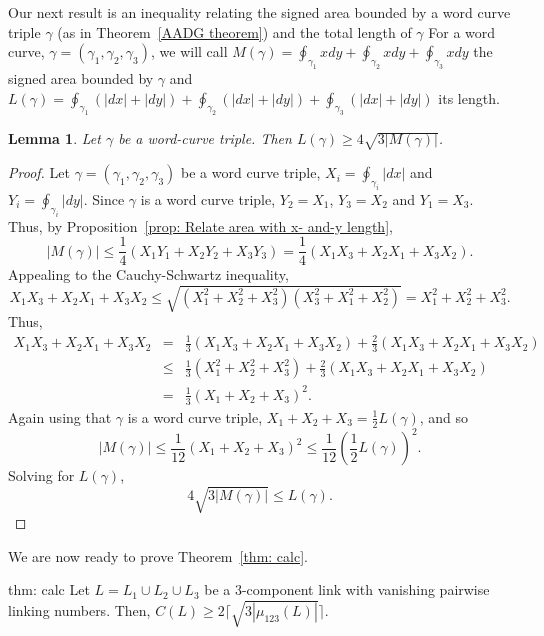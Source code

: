 \documentclass[11pt]{amsart}
\newtheorem{lemma}[theorem]{Lemma}
\theoremstyle{remark}
\newcommand{\Oint}{\displaystyle\oint}
\begin{document}
Our next result is an inequality relating the signed area bounded by a word curve triple $\gamma$ (as in Theorem~\ref{AADG theorem}) and the total length of $\gamma$ For a word curve, $\gamma = (\gamma_1, \gamma_2, \gamma_3)$, we will call $M(\gamma) = \Oint_{\gamma_1}xdy+\Oint_{\gamma_2}xdy+\Oint_{\gamma_3}xdy$ the signed area bounded by $\gamma$ and $L(\gamma) = \Oint_{\gamma_1}(|dx|+|dy|)+\Oint_{\gamma_2}(|dx|+|dy|)+\Oint_{\gamma_3}(|dx|+|dy|)$ its length.   

\begin{lemma}\label{lemma: do it for rectangles}
Let $\gamma$ be a  word-curve triple.  Then $L(\gamma)\ge 4\sqrt{3|M(\gamma)|}$.
\end{lemma}

\begin{proof}
Let $\gamma=(\gamma_1, \gamma_2, \gamma_3)$ be a word curve triple, $X_i=\Oint_{\gamma_i} |dx|$ and $Y_i=\Oint_{\gamma_i} |dy|$.  Since $\gamma$ is a word curve triple, $Y_2=X_1$, $Y_3=X_2$ and $Y_1=X_3$.  Thus, by Proposition~\ref{prop: 
Relate area with x- and-y length}, 
$$
|M(\gamma)|\le\frac{1}{4}\left(X_1Y_1+X_2Y_2+X_3Y_3\right)=\frac{1}{4}\left(X_1X_3+X_2X_1+X_3X_2\right).
$$
 Appealing to the Cauchy-Schwartz inequality, 
$$
X_1X_3+X_2X_1+X_3X_2 \le \sqrt{(X_1^2+X_2^2+X_3^2)(X_3^2+X_1^2+X_2^2)} = X_1^2+X_2^2+X_3^2.
$$
Thus,
\begin{eqnarray*}X_1X_3+X_2X_1+X_3X_2 &= &\frac{1}{3}(X_1X_3+X_2X_1+X_3X_2)+\frac{2}{3}(X_1X_3+X_2X_1+X_3X_2)
\\&\le&\frac{1}{3}(X_1^2+X_2^2+X_3^2)+\frac{2}{3}(X_1X_3+X_2X_1+X_3X_2) 
\\&=& \frac{1}{3}(X_1+X_2+X_3)^2.
\end{eqnarray*}
Again using that $\gamma$ is a word curve triple, $X_1+X_2+X_3=\frac{1}{2}L(\gamma)$, and so
$$
|M(\gamma)|
\le \frac{1}{12}(X_1+X_2+X_3)^2
\le\frac{1}{12} \left(\frac{1}{2}L(\gamma)\right)^2.
$$
Solving for $L(\gamma)$, 
$$
4\sqrt{3|M(\gamma)|}\le L(\gamma).
$$ \end{proof}

We are now ready to prove Theorem~\ref{thm: calc}.



\begin{reptheorem}{thm: calc}
Let \(L=L_1\cup L_2\cup L_3\) be a 3-component link with vanishing pairwise linking numbers. Then, \(C(L)\geq2\lceil{\sqrt{3|\mu_{123}(L)|}}\rceil\). 
\end{reptheorem}
\end{document}
